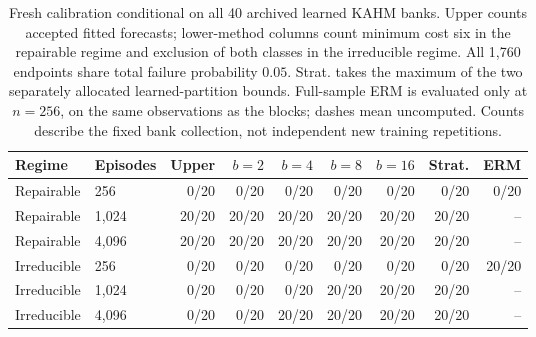 \begin{table}[t]
\centering\small
\setlength{\tabcolsep}{4pt}
\begin{tabular}{llrrrrrrr}
\toprule
Regime & Episodes & Upper & $b=2$ & $b=4$ & $b=8$ & $b=16$ & Strat. & ERM \\
\midrule
Repairable & 256 & 0/20 & 0/20 & 0/20 & 0/20 & 0/20 & 0/20 & 0/20 \\
Repairable & 1,024 & 20/20 & 20/20 & 20/20 & 20/20 & 20/20 & 20/20 & -- \\
Repairable & 4,096 & 20/20 & 20/20 & 20/20 & 20/20 & 20/20 & 20/20 & -- \\
\midrule
Irreducible & 256 & 0/20 & 0/20 & 0/20 & 0/20 & 0/20 & 0/20 & 20/20 \\
Irreducible & 1,024 & 0/20 & 0/20 & 0/20 & 20/20 & 20/20 & 20/20 & -- \\
Irreducible & 4,096 & 0/20 & 0/20 & 20/20 & 20/20 & 20/20 & 20/20 & -- \\
\bottomrule
\end{tabular}
\caption{Fresh calibration conditional on all 40 archived learned KAHM banks. Upper counts accepted fitted forecasts; lower-method columns count minimum cost six in the repairable regime and exclusion of both classes in the irreducible regime. All 1,760 endpoints share total failure probability $0.05$. Strat. takes the maximum of the two separately allocated learned-partition bounds. Full-sample ERM is evaluated only at $n=256$, on the same observations as the blocks; dashes mean uncomputed. Counts describe the fixed bank collection, not independent new training repetitions.}
\label{tab:learned-kahm-hierarchy}
\end{table}
